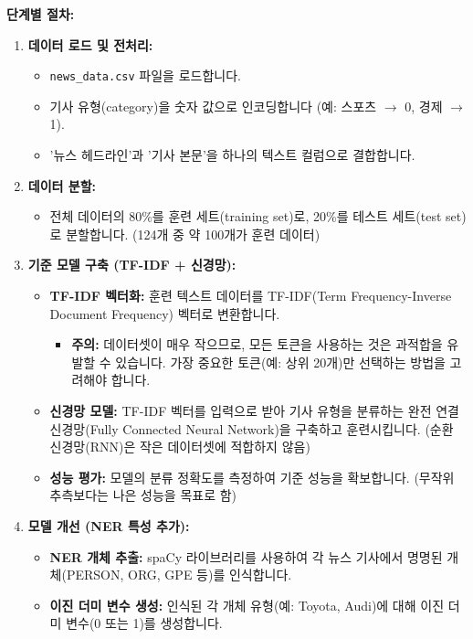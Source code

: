 \documentclass[11pt,a4paper]{article}
\theoremstyle{definition}
\begin{document}
\textbf{단계별 절차:}
\begin{enumerate}
    \item \textbf{데이터 로드 및 전처리:}
        \begin{itemize}
            \item \texttt{news\_data.csv} 파일을 로드합니다.
            \item 기사 유형(category)을 숫자 값으로 인코딩합니다 (예: 스포츠 $\rightarrow$ 0, 경제 $\rightarrow$ 1).
            \item '뉴스 헤드라인'과 '기사 본문'을 하나의 텍스트 컬럼으로 결합합니다.
        \end{itemize}
    \item \textbf{데이터 분할:}
        \begin{itemize}
            \item 전체 데이터의 80\%를 훈련 세트(training set)로, 20\%를 테스트 세트(test set)로 분할합니다. (124개 중 약 100개가 훈련 데이터)
        \end{itemize}
    \item \textbf{기준 모델 구축 (TF-IDF + 신경망):}
        \begin{itemize}
            \item \textbf{TF-IDF 벡터화:} 훈련 텍스트 데이터를 TF-IDF(Term Frequency-Inverse Document Frequency) 벡터로 변환합니다.
                \begin{itemize}
                    \item \textbf{주의:} 데이터셋이 매우 작으므로, 모든 토큰을 사용하는 것은 과적합을 유발할 수 있습니다. 가장 중요한 토큰(예: 상위 20개)만 선택하는 방법을 고려해야 합니다.
                \end{itemize}
            \item \textbf{신경망 모델:} TF-IDF 벡터를 입력으로 받아 기사 유형을 분류하는 완전 연결 신경망(Fully Connected Neural Network)을 구축하고 훈련시킵니다. (순환 신경망(RNN)은 작은 데이터셋에 적합하지 않음)
            \item \textbf{성능 평가:} 모델의 분류 정확도를 측정하여 기준 성능을 확보합니다. (무작위 추측보다는 나은 성능을 목표로 함)
        \end{itemize}
    \item \textbf{모델 개선 (NER 특성 추가):}
        \begin{itemize}
            \item \textbf{NER 개체 추출:} spaCy 라이브러리를 사용하여 각 뉴스 기사에서 명명된 개체(PERSON, ORG, GPE 등)를 인식합니다.
            \item \textbf{이진 더미 변수 생성:} 인식된 각 개체 유형(예: Toyota, Audi)에 대해 이진 더미 변수(0 또는 1)를 생성합니다.

\end{itemize}
\end{enumerate}
\end{document}
